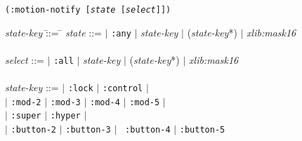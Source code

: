 {\samepage
{}
{\tt (:motion-notify [{\em state} [{\em select}]])}\\
\hspace*{.75in}
\parbox[t]{5.75in}{
\begin{tabbing}
{\em state-key} \= ::= \= \kill
{\em state}     \>::=  $|$ {\tt :any} $|$ {\em state-key} $|$
                      ({\em state-key}*) $|$ {\em xlib:mask16} \\
\\
{\em select}   \>::=  $|$ {\tt :all} $|$ {\em state-key} $|$
                      ({\em state-key}*) $|$ {\em xlib:mask16} \\
\\
{\em state-key} \>::=  $|$ {\tt :lock} $|$ {\tt :control} $|$ \\
                \>     $|$ {\tt :mod-2} $|$ {\tt :mod-3} $|$ {\tt :mod-4} $|$
{\tt :mod-5} $|$ \\
                \>     $|$ {\tt :super} $|$ {\tt :hyper} $|$\\
                \>     $|$ {\tt :button-2} $|$ {\tt :button-3} $|$ {\tt
:button-4} $|$ {\tt :button-5}\\
\end{tabbing}}
}
